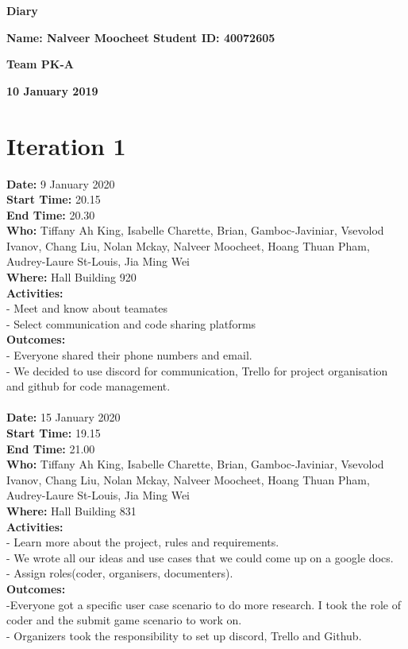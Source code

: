 \documentclass[12pt]{article}
\begin{document}
\vspace*{0.2in}
\centerline{\bf\Large Diary}

\vspace*{0.2in}
\centerline{\bf\Large Name: Nalveer Moocheet   Student ID: 40072605}

\vspace*{0.2in}
\centerline{\bf\Large Team PK-A}

\vspace*{0.2in}
\centerline{\bf\Large 10 January 2019}

\section{Iteration 1}

{\bf Date:} 9 January 2020 \\
{\bf Start Time:} 20.15 \\
{\bf End Time:} 20.30 \\
{\bf Who:} Tiffany Ah King, Isabelle Charette, Brian, Gamboc-Javiniar, Vsevolod Ivanov, Chang Liu, Nolan Mckay, Nalveer Moocheet, Hoang Thuan Pham, Audrey-Laure St-Louis, Jia Ming Wei \\
{\bf Where:} Hall Building 920 \\
{\bf Activities:}\\
- Meet and know about teamates\\ - Select communication and code sharing platforms \\
{\bf Outcomes:} \\
- Everyone shared their phone numbers and email. \\
- We decided to use discord for communication, Trello for project organisation and github for code management.
\\
\\
{\bf Date:} 15 January 2020 \\
{\bf Start Time:} 19.15 \\
{\bf End Time:} 21.00 \\
{\bf Who:} Tiffany Ah King, Isabelle Charette, Brian, Gamboc-Javiniar, Vsevolod Ivanov, Chang Liu, Nolan Mckay, Nalveer Moocheet, Hoang Thuan Pham, Audrey-Laure St-Louis, Jia Ming Wei \\
{\bf Where:} Hall Building 831 \\
{\bf Activities:}\\
- Learn more about the project, rules and requirements.\\
- We wrote all our ideas and use cases that we could come up on a google docs.\\
- Assign roles(coder, organisers, documenters).\\ 
{\bf Outcomes:}\\
-Everyone got a specific user case scenario to do more research. I took the role of coder and  the submit game scenario to work on. \\
- Organizers took the responsibility to set up discord, Trello and Github.\\
\end{document}
